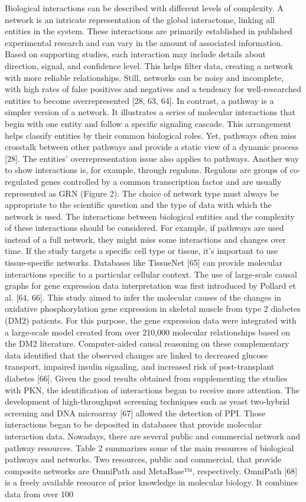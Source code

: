 Biological interactions can be described with different levels of complexity. A network is an intricate representation of the global interactome, linking all entities in the system. These interactions are primarily established in published experimental research and can vary in the amount of associated information. Based on supporting studies, each interaction may include details about direction, signal, and confidence level. This helps filter data, creating a network with more reliable relationships. Still, networks can be noisy and incomplete, with high rates of false positives and negatives and a tendency for well-researched entities to become overrepresented [28, 63, 64]. In contrast, a pathway is a simpler version of a network. It illustrates a series of molecular interactions that begin with one entity and follow a specific signaling cascade. This arrangement helps classify entities by their common biological roles. Yet, pathways often miss crosstalk between other pathways and provide a static view of a dynamic process [28]. The entities’ overrepresentation issue also applies to pathways. Another way to show interactions is, for example, through regulons. Regulons are groups of co-regulated genes controlled by a common transcription factor and are usually represented as GRN (Figure 2).  The choice of network type must always be appropriate to the scientific question and the type of data with which the network is used. The interactions between biological entities and the complexity of these interactions should be considered. For example, if pathways are used instead of a full network, they might miss some interactions and changes over time. If the study targets a specific cell type or tissue, it's important to use tissue-specific networks. Databases like TissueNet [65] can provide molecular interactions specific to a particular cellular context. The use of large-scale causal graphs for gene expression data interpretation was first introduced by Pollard et al. [64, 66]. This study aimed to infer the molecular causes of the changes in oxidative phosphorylation gene expression in skeletal muscle from type 2 diabetes (DM2) patients. For this purpose, the gene expression data were integrated with a large-scale model created from over 210,000 molecular relationships based on the DM2 literature. Computer-aided causal reasoning on these complementary data identified that the observed changes are linked to decreased glucose transport, impaired insulin signaling, and increased risk of post-transplant diabetes [66]. Given the good results obtained from supplementing the studies with PKN, the identification of interactions began to receive more attention. The development of high-throughput screening techniques such as yeast two-hybrid screening and DNA microarray [67] allowed the detection of PPI. Those interactions began to be deposited in databases that provide molecular interaction data. Nowadays, there are several public and commercial network and pathway resources. Table 2 summarizes some of the main resources of biological pathways and networks. Two resources, public and commercial, that provide composite networks are OmniPath and MetaBase™, respectively. OmniPath [68] is a freely available resource of prior knowledge in molecular biology. It combines data from over 100 